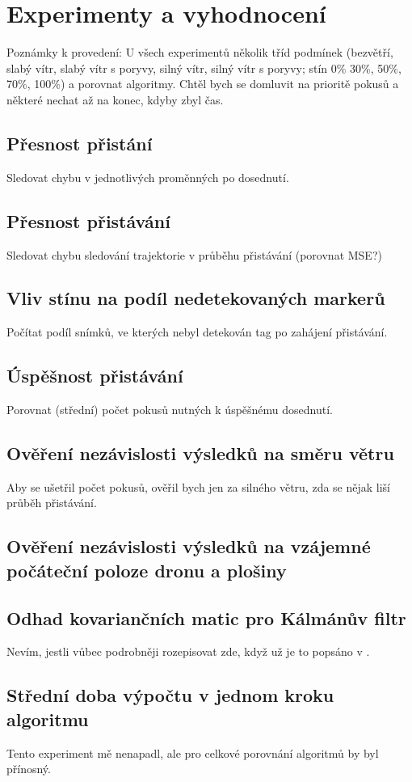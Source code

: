 \chapter{Experimenty a vyhodnocení} \label{chap:eval}
Poznámky k provedení: U všech experimentů několik tříd podmínek (bezvětří, slabý vítr, slabý vítr s poryvy, silný vítr, silný vítr s poryvy; stín 0\% 30\%, 50\%, 70\%, 100\%) a porovnat algoritmy. Chtěl bych se domluvit na prioritě pokusů a některé nechat až na konec, kdyby zbyl čas.
\section{Přesnost přistání}
  Sledovat chybu v jednotlivých proměnných po dosednutí.
\section{Přesnost přistávání}
  Sledovat chybu sledování trajektorie v průběhu přistávání (porovnat MSE?)
\section{Vliv stínu na podíl nedetekovaných markerů}
  Počítat podíl snímků, ve kterých nebyl detekován tag po zahájení přistávání.
\section{Úspěšnost přistávání}
  Porovnat (střední) počet pokusů nutných k úspěšnému dosednutí.
\section{Ověření nezávislosti výsledků na směru větru}
  Aby se ušetřil počet pokusů, ověřil bych jen za silného větru, zda se nějak liší průběh přistávání.
\section{Ověření nezávislosti výsledků na vzájemné počáteční poloze dronu a plošiny}
\section{Odhad kovariančních matic pro Kálmánův filtr}
  Nevím, jestli vůbec podrobněji rozepisovat zde, když už je to popsáno v .
\section{Střední doba výpočtu v jednom kroku algoritmu}
  Tento experiment mě nenapadl, ale pro celkové porovnání algoritmů by byl přínosný.